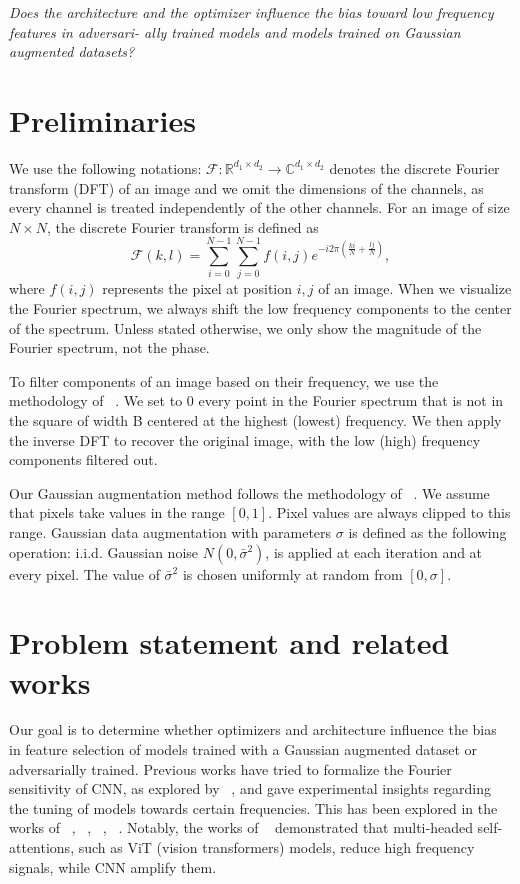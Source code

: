 \documentclass{article}
\begin{document}
\textit{Does the architecture and the optimizer influence the bias
  toward low frequency features in adversari- ally trained models and
  models trained on Gaussian augmented datasets?}
\section{Preliminaries}
We use the following notations:
$\mathcal{F}: \mathbb{R}^{d_{1} \times d_{2}} \to
\mathbb{C}^{d_{1}\times d_{2}}$ denotes the discrete Fourier transform
(DFT) of an image and we omit the dimensions of the channels, as every
channel is treated independently of the other channels. For an image
of size $N \times N$, the discrete Fourier transform is defined as
\begin{equation}
  \mathcal{F}(k,l) =  \sum_{i=0}^{N-1} \sum_{j=0}^{N-1}f(i,j)e^{-i2\pi(\frac{ki}{N}+\frac{lj}{N})},
\end{equation}
where $f(i,j)$ represents the pixel at position $i,j$ of an
image. When we visualize the Fourier spectrum, we always shift the low
frequency components to the center of the spectrum. Unless stated
otherwise, we only show the magnitude of the Fourier spectrum, not the
phase.

To filter components of an image based on their frequency, we use the
methodology of ~\citep{yin2020fourier}. We set to 0 every point in the
Fourier spectrum that is not in the square of width B centered at the
highest (lowest) frequency. We then apply the inverse DFT to recover
the original image, with the low (high) frequency components filtered
out.

Our Gaussian augmentation method follows the methodology of
~\citep{yin2020fourier}. We assume that pixels take values in the
range $[0, 1]$. Pixel values are always clipped to this
range. Gaussian data augmentation with parameters $\sigma$ is defined
as the following operation: i.i.d. Gaussian noise
$N(0, \bar{\sigma}^{2})$, is applied at each iteration and at every
pixel. The value of $\bar{\sigma}^{2}$ is chosen uniformly at random
from $[0, \sigma]$.

\section{Problem statement and related works}
Our goal is to determine whether optimizers and architecture influence
the bias in feature selection of models trained with a Gaussian
augmented dataset or adversarially trained. Previous works have tried
to formalize the Fourier sensitivity of CNN, as explored by
~\citep{krishnamachari2023fourier}, and gave experimental insights
regarding the tuning of models towards certain frequencies. This has
been explored in the works of ~\citep{krishnamachari2023fourier},
~\citep{geirhos2022imagenettrained}, ~\citep{yin2020fourier},
~\citep{mo2022adversarial}. Notably, the works of
~\citep{park2022vision} demonstrated that multi-headed
self-attentions, such as ViT (vision transformers) models, reduce high
frequency signals, while CNN amplify them.
\end{document}

